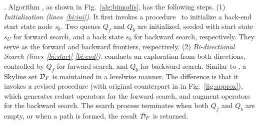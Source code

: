 . 
Algorithm \bimodis, as shown in Fig.~\ref{alg:bimodis}, 
has the following steps. (1) {\em Initialization (lines~\ref{bi:ini})}. It first invokes a procedure~ to initialize a back-end start state node $s_b$. 
Two queues $Q_f$ and $Q_b$ are initialized, seeded with 
start state $s_U$ for forward search, and a back state $s_b$ 
for backward search, respectively. They serve as the forward and backward frontiers, respectively. 
(2) {\em Bi-directional Search (lines~\ref{bi:start}-\ref{bi:end}).}
\bimodis conducts an exploration from both directions, controlled by $Q_f$ for forward search, and $Q_b$ for backward search.  
Similar to \apxmodis, a Skyline set ${\mathcal D}_F$ is maintained 
in a levelwise manner. The difference is that 
it invokes a revised procedure \opg (with original counterpart in \apxmodis in Fig.~\ref{fig:approx}), which generates reduct operators for the forward search, and augment operators for the backward search.
The search process terminates when both $Q_f$ and $Q_b$ are empty, or when a path is formed, the result ${\mathcal D}_F$ is returned. 




